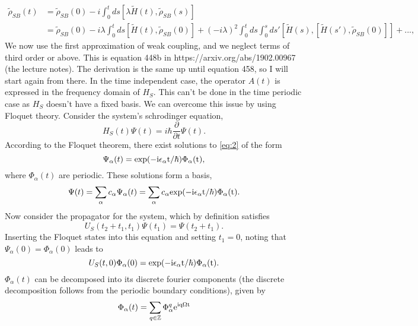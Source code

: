 \documentclass[10pt]{article}
\numberwithin{equation}{section}
\begin{document}
\begin{align}
\tilde{\rho}_{SB}(t) &= \tilde{\rho}_{SB}(0) -i\int_0^t ds[\lambda\tilde{H}(t),\tilde{\rho}_{SB}(s)] \\
			     &=   \tilde{\rho}_{SB}(0) -i\lambda\int_0^t ds[\tilde{H}(t),\tilde{\rho}_{SB}(0)] +(-i\lambda)^2\int_0^t ds\int_0^s ds'[\tilde{H}(s),[\tilde{H}(s'),\tilde{\rho}_{SB}(0)]] +...,
\end{align}
We now use the first approximation of weak coupling, and we neglect terms of third order or above. This is equation 448b in https://arxiv.org/abs/1902.00967 (the lecture notes). The derivation is the same up until equation 458, so I will start again from there. In the time independent case, the operator $A(t)$ is expressed in the frequency domain of $H_{S}$. This can't be done in the time periodic case as $H_{S}$ doesn't have a fixed basis. We can overcome this issue by using Floquet theory. Consider the system's schrodinger equation, 
\begin{equation} \label{eq:2}
H_{S}(t)\Psi(t) = i\hbar \frac{\partial}{\partial t} \Psi(t).
\end{equation}
According to the Floquet theorem, there exist solutions to \ref{eq:2} of the form
\begin{equation} \label{eq:19}
\Psi_{\alpha}(t) = \rm exp(-i\epsilon_{\alpha}t/\hbar)\Phi_{\alpha}(t),
\end{equation}
where $\Phi_{\alpha}(t)$ are periodic. These solutions form a basis,
\begin{equation}
\Psi(t) = \sum_{\alpha} c_{\alpha} \Psi_{\alpha}(t) = \sum_{\alpha} c_{\alpha} \rm exp(-i\epsilon_{\alpha}t/\hbar)\Phi_{\alpha}(t).
\end{equation}
Now consider the propagator for the system, which by definition satisfies
\begin{equation}
U_{S}(t_2 + t_1,t_1)\Psi(t_1) = \Psi(t_2+t_1).
\end{equation}
Inserting the Floquet states into this equation and setting $t_1=0$, noting that $\Psi_{\alpha}(0)=\Phi_{\alpha}(0)$ leads to 
\begin{equation} \label{eq:3}
U_{S}(t,0)\Phi_{\alpha}(0) = \rm exp(-i\epsilon_{\alpha}t/\hbar)\Phi_{\alpha}(t).
\end{equation}
$\Phi_{\alpha}(t)$ can be decomposed into its discrete fourier components (the discrete decomposition follows from the periodic boundary conditions), given by 
\begin{equation} \label{eq:4}
\Phi_{\alpha}(t) = \sum_{q \in\mathbb{Z}}  \Phi_{\alpha}^{q} \rm  e^{iq\Omega t}  
\end{equation}
\end{document}
